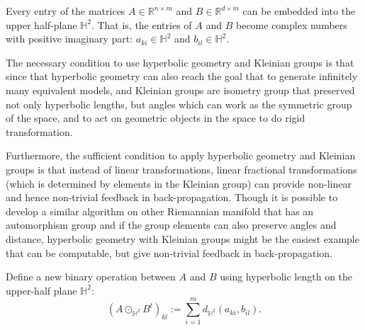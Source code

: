 \documentclass{article}
\theoremstyle{plain}
\theoremstyle{plain} %
\theoremstyle{definition}  %
\theoremstyle{remark}  %
\theoremstyle{plain}
\begin{document}


Every entry of the matrices $A\in\mathbb{R}^{n\times m}$ and $B \in\mathbb{R}^{d\times m}$ can be embedded into the upper half-plane $\mathbb{H}^2$. That is, the entries of $A$ and $B$ become complex numbers with positive imaginary part: $a_{ki}\in\mathbb{H}^2$ and $b_{il}\in\mathbb{H}^2$.

The necessary condition to use hyperbolic geometry and Kleinian groups is that since that hyperbolic geometry can also reach the goal that to generate infinitely many equivalent models, and Kleinian groups are isometry group that preserved not only hyperbolic lengths, but angles which can work as the symmetric group of the space, and to act on geometric objects in the space to do rigid transformation.

Furthermore, the sufficient condition to apply hyperbolic geometry and Kleinian groups is that instead of linear transformations, linear fractional transformations (which is determined by elements in the Kleinian group) can provide non-linear and hence non-trivial feedback in back-propagation. Though it is possible to develop a similar algorithm on other Riemannian manifold that has an automorphism group and if the group elements can also preserve angles and distance, hyperbolic geometry with Kleinian groups might be the easiest example that can be computable, but give non-trivial feedback in back-propagation.


Define a new binary operation between $A$ and $B$ using hyperbolic length on the upper-half plane $\mathbb{H}^2$\cite{beardon2012geometry}:
$$
\left( A\odot_{\mathbb{H}^2} B^t \right)_{kl} :=\sum\limits_{i=1}^m d_{\mathbb{H}^2} \left( a_{ki} , b_{il} \right).
$$
\end{document}
